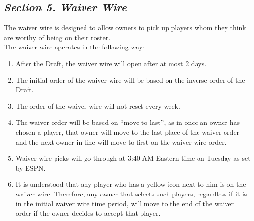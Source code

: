 \documentclass{article}
\begin{document}
    \subsection{\textit{Section 5. Waiver Wire}}
    The waiver wire is designed to allow owners to pick up players whom they think are worthy of being on their roster.\\

    \noindent The waiver wire operates in the following way:
    \begin{enumerate}[label=\Alph*)]
        \item After the Draft, the waiver wire will open after at most 2 days.
        \item The initial order of the waiver wire will be based on the inverse order of the Draft.
        \item The order of the waiver wire will not reset every week.
        \item The waiver order will be based on “move to last”, as in once an owner has chosen a player, that owner will move to the last place of the waiver order and the next owner in line will move to first on the waiver wire order.
        \item Waiver wire picks will go through at 3:40 AM Eastern time on Tuesday as set by ESPN.
        \item It is understood that any player who has a yellow icon next to him is on the waiver wire. Therefore, any owner that selects such players, regardless if it is in the initial waiver wire time period, will move to the end of the waiver order if the owner decides to accept that player.
    \end{enumerate}
\end{document}
